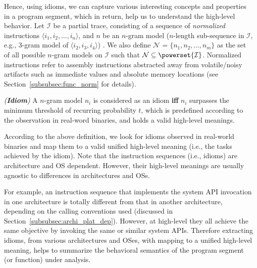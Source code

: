 Hence, using idioms, we can capture various interesting concepts and properties in a program segment, which in return, help us to understand the high-level behavior. %
Let $\mathcal{I}$  be a partial trace, consisting of a sequence of \emph{normalized} instructions $\langle i_1,i_2, ..., i_n \rangle$, and $n$ be an $n$-gram model ($n$-length sub-sequence in $\mathcal{I}$, e.g., 3-gram model of $\langle{i_2,i_3,i_4} \rangle$) . We also define $\mathcal{N}$ =  $\{n_1,n_2, ..., n_m \}$ as the set of all possible $n$-gram models on $\mathcal{I}$ such that $\mathcal{N} \subseteq \powerset{\mathcal{I}}$.
Normalized instructions refer to assembly instructions abstracted away from volatile/noisy artifacts such as immediate values and absolute memory locations (see Section~\ref{subsubsec:func_norm} for details).

 \begin{mydef}
\emph{(\textbf{Idiom})} A $n$-gram model $n_i$  is considered as an idiom \textbf{iff} $n_i$ surpasses the minimum threshold of recurring probability $t$, which is predefined according to the observation in real-word binaries, and holds a valid high-level meanings.
\end{mydef}

 According to the above definition, we look for idioms observed in real-world binaries and map them to a valid unified high-level meaning (i.e., the tasks achieved by the idiom). %
 Note that the instruction sequences (i.e., idioms) are architecture and OS dependent. However, their high-level meanings are usually agnostic to differences in architectures and OSs.

 For example, an instruction sequence that implements the system API invocation in one architecture is totally different from that in another architecture, depending on the calling conventions used (discussed in Section~\ref{subsubsec:archi_plat_dep}). However, at high-level they all achieve the same objective by invoking the same or similar system APIs.
Therefore extracting idioms, from various architectures and OSes, with mapping to a unified high-level meaning, helps to summarize the behavioral semantics of the program segment (or function) under analysis.


